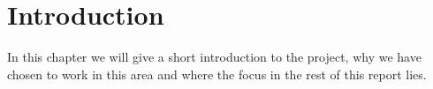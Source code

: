 \chapter{Introduction}
In this chapter we will give a short introduction to the project, why we have chosen to work in this area and where the focus in the rest of this report lies. 




